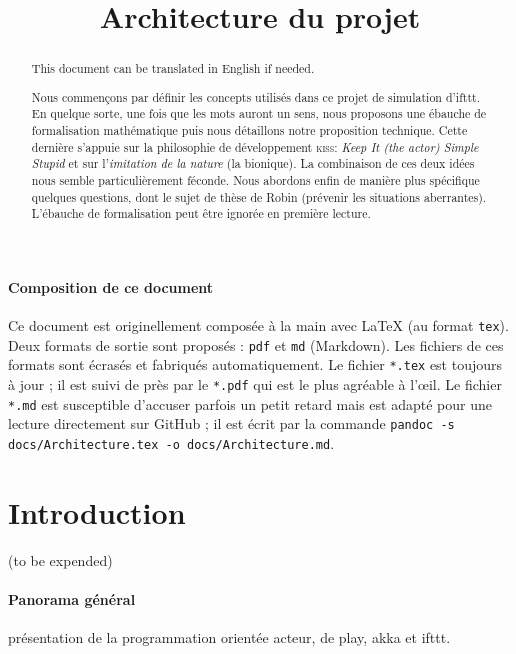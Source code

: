 \documentclass[11pt]{article}
\title{Architecture du projet}
\begin{document}
\maketitle
{}
\begin{abstract}
This document can be translated in English if needed.

Nous commençons par définir les concepts utilisés dans ce projet de simulation d'ifttt. En quelque sorte, une fois que les mots auront un sens, nous proposons une ébauche de formalisation mathématique puis nous détaillons notre proposition technique. Cette dernière s'appuie sur la philosophie de développement \textsc{kiss}: \textsl{Keep It (the actor) Simple Stupid} et sur l'\textsl{imitation de la nature} (la bionique). La combinaison de ces deux idées nous semble particulièrement féconde. Nous abordons enfin de manière plus spécifique quelques questions, dont le sujet de thèse de Robin (prévenir les situations aberrantes). L'ébauche de formalisation peut être ignorée en première lecture.
\end{abstract}
\cleardoublepage

\paragraph{Composition de ce document} Ce document est originellement composée à la main avec \LaTeX{} (au format \texttt{tex}). Deux formats de sortie sont proposés : \texttt{pdf} et \texttt{md} (Markdown). Les fichiers de ces formats sont écrasés et fabriqués automatiquement. Le fichier \texttt{*.tex} est toujours à jour ; il est suivi de près par le \texttt{*.pdf} qui est le plus agréable à l'œil. Le fichier \texttt{*.md} est susceptible d'accuser parfois un petit retard mais est adapté pour une lecture directement sur GitHub ; il est écrit par la commande \texttt{pandoc -s docs/Architecture.tex -o docs/Architecture.md}.

\tableofcontents

\section{Introduction}

(to be expended)

\paragraph{Panorama général} présentation de la programmation orientée acteur, de play, akka et ifttt.
\end{document}
